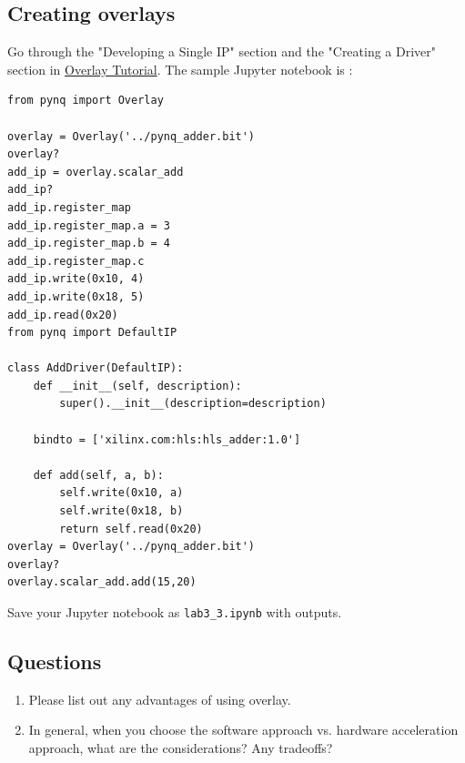 \documentclass[a4paper,12pt,twoside]{article}
\begin{document}
\subsection{Creating overlays}\label{S54}
Go through the "Developing a Single IP" section and the "Creating a Driver" section in \href{https://pynq.readthedocs.io/en/latest/overlay_design_methodology/overlay_tutorial.html}{Overlay Tutorial}.
The sample Jupyter notebook is \cite{pynqadder} \cite{csdnoverlay}:
\begin{verbatim}
from pynq import Overlay

overlay = Overlay('../pynq_adder.bit')
overlay?
add_ip = overlay.scalar_add
add_ip?
add_ip.register_map
add_ip.register_map.a = 3
add_ip.register_map.b = 4
add_ip.register_map.c
add_ip.write(0x10, 4)
add_ip.write(0x18, 5)
add_ip.read(0x20)
from pynq import DefaultIP

class AddDriver(DefaultIP):
    def __init__(self, description):
        super().__init__(description=description)

    bindto = ['xilinx.com:hls:hls_adder:1.0']

    def add(self, a, b):
        self.write(0x10, a)
        self.write(0x18, b)
        return self.read(0x20)
overlay = Overlay('../pynq_adder.bit')
overlay?
overlay.scalar_add.add(15,20)
\end{verbatim}
Save your Jupyter notebook as \texttt{lab3\_3.ipynb} with outputs.
\subsection{Questions}\label{S5Q}
\begin{enumerate}
    \item Please list out any advantages of using overlay.
    \item In general, when you choose the software approach vs. hardware acceleration approach, what are the considerations? Any tradeoffs?
\end{enumerate}

\end{document}

